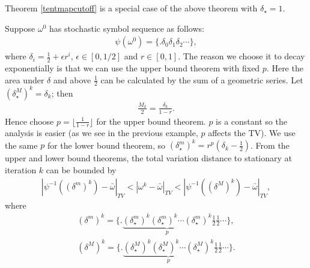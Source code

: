Theorem \ref{tentmapcutoff} is a special case of the above theorem with $\delta_\star = 1$. 



\begin{example}
Suppose $\omega^0$ has stochastic symbol sequence as follows:
  \begin{eqnarray}
  \label{expw0}
   \psi(\omega^0) =  \{.\delta_0 \delta_1 \delta_2 \cdots\},
  \end{eqnarray}
where $\delta_i = \frac{1}{2} + \epsilon r^i$, $\epsilon \in [0,1/2]$ and $r\in [0,1]$. The reason we choose it to decay exponentially is that we can use the upper bound theorem with fixed $p$. Here the area under $\delta$ and above $\frac{1}{2}$ can be calculated by the sum of a geometric series. Let $(\delta^M_\star)^k = \delta_k$; then
  \begin{eqnarray}
   \frac{M_k}{2} = \frac{\delta_k}{1-r}.
  \end{eqnarray}
Hence choose $p = \lfloor \frac{1}{1-r} \rfloor $ for the upper bound theorem. $p$ is a constant so the analysis is easier (as we see in the previous example, $p$ affects the TV). We use the same $p$ for the lower bound theorem, so $(\delta^m_\star)^k = r^p(\delta_{k}-\frac{1}{2}) $. From the upper and lower bound theorems, the total variation distance to stationary at iteration $k$ can be bounded by
  \begin{eqnarray}
  \label{omegakbound}
    |\psi^{-1}((\delta^m)^k)-\bar{\omega}|_{TV} <|\omega^k-\bar{\omega}|_{TV}<|\psi^{-1}((\delta^M)^k)-\bar{\omega}|_{TV},
  \end{eqnarray}
where
  \begin{eqnarray}
  \label{defdeltamM}
   (\delta^m)^k = \{.\underbrace{(\delta^m_\star)^k (\delta^m_\star)^k \cdots (\delta^m_\star)^k}_{p}\frac{1}{2}\frac{1}{2}\cdots\}, \nonumber\\
   (\delta^M)^k = \{.\underbrace{(\delta^M_\star)^k (\delta^M_\star)^k \cdots (\delta^M_\star)^k}_{p}\frac{1}{2}\frac{1}{2}\cdots\}.
  \end{eqnarray}


\end{example}
